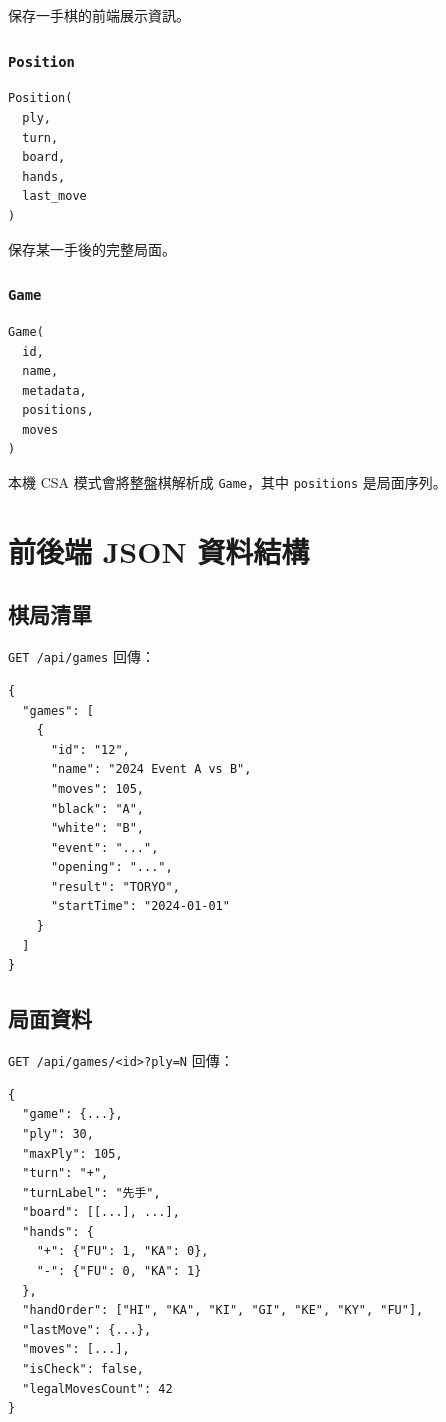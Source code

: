 \documentclass[12pt,a4paper,fontset=none]{ctexart}
\begin{document}
保存一手棋的前端展示資訊。

\subsubsection{\texttt{Position}}

\begin{lstlisting}[style=cmd]
Position(
  ply,
  turn,
  board,
  hands,
  last_move
)
\end{lstlisting}

保存某一手後的完整局面。

\subsubsection{\texttt{Game}}

\begin{lstlisting}[style=cmd]
Game(
  id,
  name,
  metadata,
  positions,
  moves
)
\end{lstlisting}

本機 CSA 模式會將整盤棋解析成 \texttt{Game}，其中 \texttt{positions} 是局面序列。

\section{前後端 JSON 資料結構}

\subsection{棋局清單}

\texttt{GET /api/games} 回傳：

\begin{lstlisting}[style=cmd]
{
  "games": [
    {
      "id": "12",
      "name": "2024 Event A vs B",
      "moves": 105,
      "black": "A",
      "white": "B",
      "event": "...",
      "opening": "...",
      "result": "TORYO",
      "startTime": "2024-01-01"
    }
  ]
}
\end{lstlisting}

\subsection{局面資料}

\texttt{GET /api/games/<id>?ply=N} 回傳：

\begin{lstlisting}[style=cmd]
{
  "game": {...},
  "ply": 30,
  "maxPly": 105,
  "turn": "+",
  "turnLabel": "先手",
  "board": [[...], ...],
  "hands": {
    "+": {"FU": 1, "KA": 0},
    "-": {"FU": 0, "KA": 1}
  },
  "handOrder": ["HI", "KA", "KI", "GI", "KE", "KY", "FU"],
  "lastMove": {...},
  "moves": [...],
  "isCheck": false,
  "legalMovesCount": 42
}
\end{lstlisting}
\end{document}
